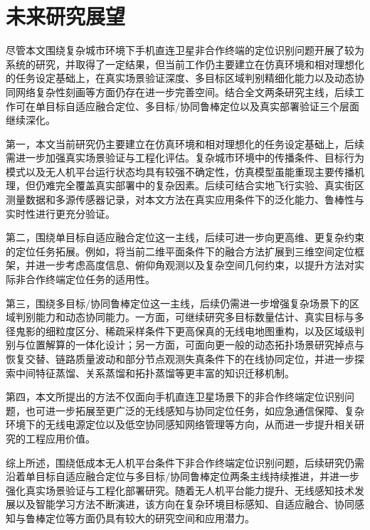 \section{未来研究展望}
\label{sec:5_2}

尽管本文围绕复杂城市环境下手机直连卫星非合作终端的定位识别问题开展了较为系统的研究，并取得了一定结果，但当前工作仍主要建立在仿真环境和相对理想化的任务设定基础上，在真实场景验证深度、多目标区域判别精细化能力以及动态协同网络复杂性刻画等方面仍存在进一步完善空间。结合全文两条研究主线，后续工作可在单目标自适应融合定位、多目标/协同鲁棒定位以及真实部署验证三个层面继续深化。

第一，本文当前研究仍主要建立在仿真环境和相对理想化的任务设定基础上，后续需进一步加强真实场景验证与工程化评估。复杂城市环境中的传播条件、目标行为模式以及无人机平台运行状态均具有较强不确定性，仿真模型虽能重现主要传播机理，但仍难完全覆盖真实部署中的复杂因素。后续可结合实地飞行实验、真实街区测量数据和多源传感器记录，对本文方法在真实应用条件下的泛化能力、鲁棒性与实时性进行更充分验证。

第二，围绕单目标自适应融合定位这一主线，后续可进一步向更高维、更复杂约束的定位任务拓展。例如，将当前二维平面条件下的融合方法扩展到三维空间定位框架，并进一步考虑高度信息、俯仰角观测以及复杂空间几何约束，以提升方法对实际非合作终端定位任务的适用性。

第三，围绕多目标/协同鲁棒定位这一主线，后续仍需进一步增强复杂场景下的区域判别能力和动态协同能力。一方面，可继续研究多目标数量估计、真实目标与多径鬼影的细粒度区分、稀疏采样条件下更高保真的无线电地图重构，以及区域级判别与位置解算的一体化设计；另一方面，可面向更一般的动态拓扑场景研究掉点与恢复交替、链路质量波动和部分节点观测失真条件下的在线协同定位，并进一步探索中间特征蒸馏、关系蒸馏和拓扑蒸馏等更丰富的知识迁移机制。

第四，本文所提出的方法不仅面向手机直连卫星场景下的非合作终端定位识别问题，也可进一步拓展至更广泛的无线感知与协同定位任务，如应急通信保障、复杂环境下的无线电源定位以及低空协同感知网络管理等方向，从而进一步提升相关研究的工程应用价值。

综上所述，围绕低成本无人机平台条件下非合作终端定位识别问题，后续研究仍需沿着单目标自适应融合定位与多目标/协同鲁棒定位两条主线持续推进，并进一步强化真实场景验证与工程化部署研究。随着无人机平台能力提升、无线感知技术发展以及智能学习方法不断演进，该方向在复杂环境目标感知、自适应融合、协同感知与鲁棒定位等方面仍具有较大的研究空间和应用潜力。
